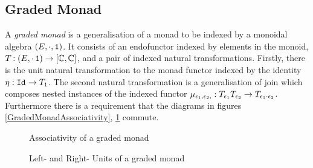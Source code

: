 \documentclass{Report}
\begin{document}
\subsection{Graded Monad}


A \textit{graded monad} is a generalisation of a monad to be indexed by a monoidal algebra $(E,\cdot, \texttt{1})$. It consists of an endofunctor indexed by elements in the monoid, $T_{}{}: (E, \cdot\, \texttt{1})  \rightarrow [\mathbb{C}, \mathbb{C}]$, and a pair of indexed natural transformations. Firstly, there is the unit natural transformation to the monad functor indexed by the identity $\eta_{}: \texttt{Id}_{} \rightarrow T_{\texttt{1}}{}$. The second natural transformation is a generalisation of join which composes nested instances of the indexed functor $\mu_{\epsilon_1, \epsilon_2, }: T_{\epsilon_1}{T_{\epsilon_2}{}} \rightarrow T_{\epsilon_1 \cdot \epsilon_2}{}$. Furthermore there is a requirement that the diagrams in figures \ref{GradedMonadAssociativity}, \ref{GradedMonadUnits} commute.


\begin{figure}
\begin{framed}
        \centering
        \begin{minipage}{0.45\textwidth}
            \centering
            \caption{Associativity of a graded monad}
            \label{GradedMonadAssociativity}
        \end{minipage}\hfill
        \begin{minipage}{0.45\textwidth}
            \centering
            \caption{Left- and Right- Units of a graded monad}
            \label{GradedMonadUnits}
        \end{minipage}
\end{framed}
\end{figure}
\end{document}
